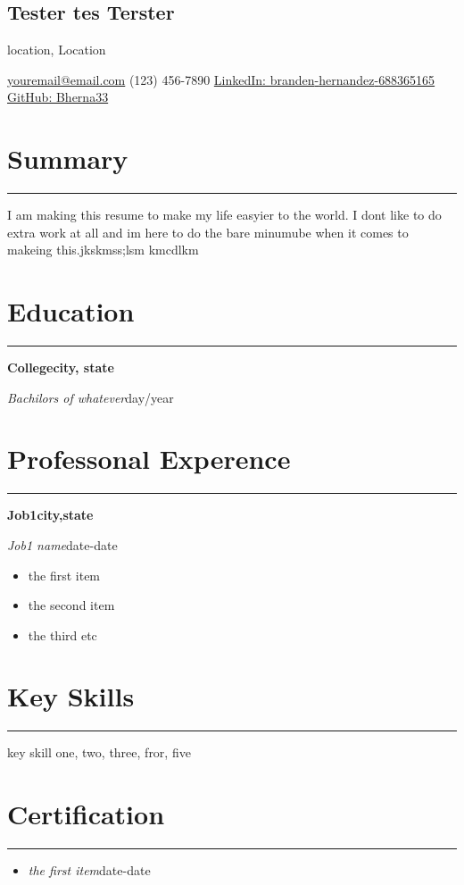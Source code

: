 \documentclass[11pt]{article}%
\newcommand{\resumesection}[1]{\vspace{-0.5cm}\section*{\color{highlight}#1}\vspace{-0.2cm}\hrule\vspace{0.2cm}}%
\begin{document}
%
\normalsize%
%
\setlength\parindent{9pt}%
%
\renewcommand\labelitemi{{-}}%
\pagestyle{empty}%
\renewcommand{\familydefault}{\sfdefault}%
\newcommand{\github}{\textcolor{rgb:red,110;green,84;blue,148}{\faGithubSquare}}%
\newcommand{\linkedIn}{\textcolor{rgb:red,6;green,108;blue,170}{\faLinkedinSquare}}%
\newcommand{\location}[1]{\begin{center}\vspace{-0.1cm}#1\vspace{-0.3cm}\end{center}}%
\newcommand{\contactInfo}[1]{\begin{center}\vspace{-0.1cm}#1\vspace{-0.3cm}\end{center}}%
\newcommand{\name}[1]{\begin{center}\section*{\LARGE \color{highlight}#1}\vspace{-0.8cm}\end{center}}%
\name{Tester tes Terster}%
\location{location, Location}%
\contactInfo{\href{mailto:email@domain}{youremail@email.com}{ (123) 456{-}7890 }{\href{https://www.linkedin.com/in/branden{-}hernandez{-}688365165/}{LinkedIn: branden{-}hernandez{-}688365165}}{\href{https://github.com/Bherna33}{ GitHub: Bherna33}}}%
\resumesection{Summary}%
I am making this resume to make my life easyier to the world. I dont like to do extra work at all and im here to do the bare minumube when it comes to makeing this.jkskmss;lsm kmcdlkm%
\resumesection{Education}%
\textbf{College}{\textbf{\hfill {city, state}}}%
\par%
\textit{Bachilors of whatever}{\hfill {day/year}}%
\par%
\resumesection{Professonal Experence}%
\textbf{Job1}{\textbf{\hfill{city,state}}}%
\par%
\textit{Job1 name}{\hfill{date{-}date}}%
\begin{itemize}%
\item%
the first item%
\item%
the second item%
\item%
the third etc%
\end{itemize}%
\resumesection{Key Skills}%
key skill one, two, three, fror, five%
\resumesection{Certification}%
\begin{itemize}%
\item%
\textit{the first item}{\hfill{date{-}date}}%
\end{itemize}%
\end{document}
